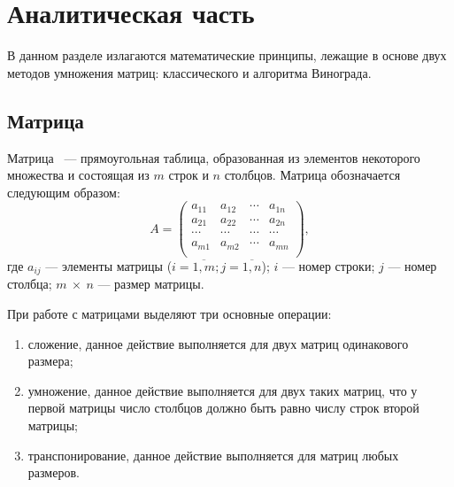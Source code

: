 \chapter{Аналитическая часть}

В данном разделе излагаются математические принципы, лежащие в основе двух методов умножения матриц: классического и алгоритма Винограда.

\section{Матрица}
Матрица~\cite[с.~5]{matrix} --- прямоугольная таблица, образованная из элементов некоторого множества и состоящая из $m$ строк и $n$ столбцов.
Матрица обозначается следующим образом:
\begin{equation}
	A=\begin{pmatrix}
		a_{11} & a_{12} & \cdots & a_{1n} \\
		a_{21} & a_{22} & \cdots & a_{2n} \\
		\cdots & \cdots & \cdots & \cdots \\
		a_{m1} & a_{m2} & \cdots & a_{mn} \\
	\end{pmatrix},
\end{equation}
\noindent где $a_{ij}$ --- элементы матрицы ($i=\overline{1,m}; j=\overline{1,n}$); $i$ --- номер строки; $j$ --- номер столбца; $m~\times~n$ --- размер матрицы.

При работе с матрицами выделяют три основные операции:
\begin{enumerate}
	\item сложение, данное действие выполняется для двух матриц одинакового размера;
	\item умножение, данное действие выполняется для двух таких матриц, что у первой матрицы число столбцов должно быть равно числу строк второй матрицы;
	\item транспонирование, данное действие выполняется для матриц любых размеров.
\end{enumerate}


